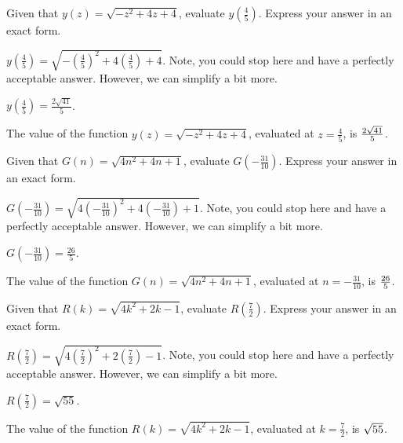 \begin{shuffle}
\begin{exercise}
Given that $y(z)=\sqrt{-z^2+4 z+4}$, evaluate $y\left(\frac{4}{5}\right)$. Express your answer in an exact form.
\begin{solution}
\begin{hint}
$y\left(\frac{4}{5}\right)=\sqrt{-(\frac{4}{5})^2+4 (\frac{4}{5})+4}$. Note, you could stop here and have a perfectly acceptable answer. However, we can simplify a bit more. 
\end{hint}
\begin{hint}
$y\left(\frac{4}{5}\right)=\frac{2 \sqrt{41}}{5}$.
\end{hint}
The value of the function $y(z)=\sqrt{-z^2+4 z+4}$, evaluated at $z=\frac{4}{5}$, is ${\frac{2 \sqrt{41}}{5}}$.
\end{solution}
\end{exercise}

\begin{exercise}
Given that $G(n)=\sqrt{4 n^2+4 n+1}$, evaluate $G\left(-\frac{31}{10}\right)$. Express your answer in an exact form.
\begin{solution}
\begin{hint}
$G\left(-\frac{31}{10}\right)=\sqrt{4 (-\frac{31}{10})^2+4 (-\frac{31}{10})+1}$. Note, you could stop here and have a perfectly acceptable answer. However, we can simplify a bit more. 
\end{hint}
\begin{hint}
$G\left(-\frac{31}{10}\right)=\frac{26}{5}$.
\end{hint}
The value of the function $G(n)=\sqrt{4 n^2+4 n+1}$, evaluated at $n=-\frac{31}{10}$, is ${\frac{26}{5}}$.
\end{solution}
\end{exercise}

\begin{exercise}
Given that $R(k)=\sqrt{4 k^2+2 k-1}$, evaluate $R\left(\frac{7}{2}\right)$. Express your answer in an exact form.
\begin{solution}
\begin{hint}
$R\left(\frac{7}{2}\right)=\sqrt{4 (\frac{7}{2})^2+2 (\frac{7}{2})-1}$. Note, you could stop here and have a perfectly acceptable answer. However, we can simplify a bit more. 
\end{hint}
\begin{hint}
$R\left(\frac{7}{2}\right)=\sqrt{55}$.
\end{hint}
The value of the function $R(k)=\sqrt{4 k^2+2 k-1}$, evaluated at $k=\frac{7}{2}$, is ${\sqrt{55}}$.
\end{solution}
\end{exercise}


\end{shuffle}
